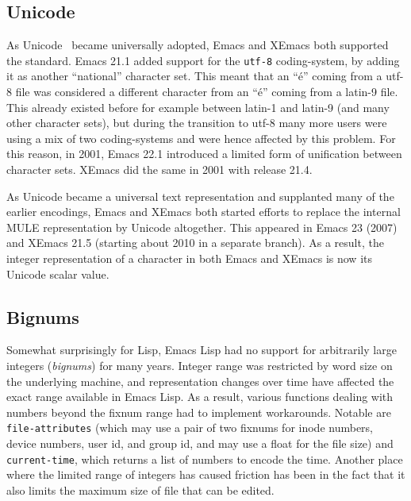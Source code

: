 \documentclass[format=acmsmall, review]{acmart}
\newcommand \Elisp {Emacs Lisp}
\begin{document}
\subsection{Unicode}

As Unicode~\cite{Unicode6} became universally adopted, Emacs and XEmacs both
supported the standard.  Emacs 21.1 added support for the \texttt{utf-8}
coding-system, by adding it as another ``national'' character set.
This meant that an ``é'' coming from a utf-8 file was considered a different
character from an ``é'' coming from a latin-9 file.  This already
existed before for example between latin-1 and latin-9 (and many other
character sets), but during the transition to utf-8 many more users were
using a mix of two coding-systems and were hence affected by this problem.
For this reason, in 2001, Emacs 22.1 introduced a limited form of
unification between character sets.  XEmacs did the same in 2001 with
release 21.4.

As Unicode became a universal text representation and supplanted many
of the earlier encodings, Emacs and XEmacs both started efforts to
replace the internal MULE representation by Unicode altogether.  This
appeared in Emacs 23 (2007) and XEmacs 21.5 (starting about 2010 in a
separate branch).  As a result, the integer representation of a
character in both Emacs and XEmacs is now its Unicode scalar value.


\subsection{Bignums}

Somewhat surprisingly for Lisp, \Elisp{} had no support for
arbitrarily large integers (\emph{bignums}) for many years.
Integer range was restricted by word size on the underlying machine,
and representation changes over time have affected the exact range
available in \Elisp.
As a result, various functions dealing with numbers beyond the fixnum range
had to implement workarounds.  Notable are \texttt{file-attributes} (which
may use a pair of two fixnums for inode numbers, device numbers, user id,
and group id, and may use a float for the file size) and
\texttt{current-time}, which returns a list of numbers to encode the time.
Another place where the limited range of integers has caused friction has
been in the fact that it also limits the maximum size of file that can
be edited.
\end{document}
